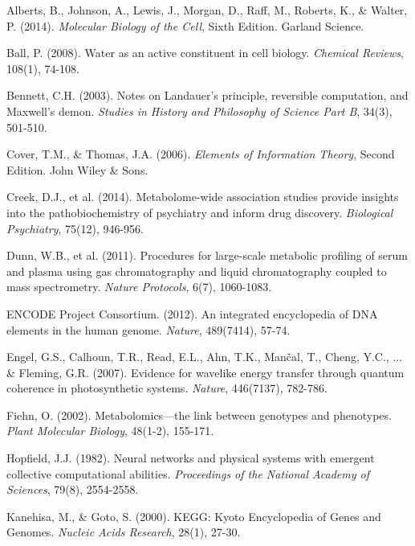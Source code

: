 \documentclass[12pt,a4paper]{article}
\begin{document}
\begin{thebibliography}{99}

Alberts, B., Johnson, A., Lewis, J., Morgan, D., Raff, M., Roberts, K., \& Walter, P. (2014). \textit{Molecular Biology of the Cell}, Sixth Edition. Garland Science.

Ball, P. (2008). Water as an active constituent in cell biology. \textit{Chemical Reviews}, 108(1), 74-108.

Bennett, C.H. (2003). Notes on Landauer's principle, reversible computation, and Maxwell's demon. \textit{Studies in History and Philosophy of Science Part B}, 34(3), 501-510.

Cover, T.M., \& Thomas, J.A. (2006). \textit{Elements of Information Theory}, Second Edition. John Wiley \& Sons.

Creek, D.J., et al. (2014). Metabolome-wide association studies provide insights into the pathobiochemistry of psychiatry and inform drug discovery. \textit{Biological Psychiatry}, 75(12), 946-956.

Dunn, W.B., et al. (2011). Procedures for large-scale metabolic profiling of serum and plasma using gas chromatography and liquid chromatography coupled to mass spectrometry. \textit{Nature Protocols}, 6(7), 1060-1083.

ENCODE Project Consortium. (2012). An integrated encyclopedia of DNA elements in the human genome. \textit{Nature}, 489(7414), 57-74.

Engel, G.S., Calhoun, T.R., Read, E.L., Ahn, T.K., Mančal, T., Cheng, Y.C., ... \& Fleming, G.R. (2007). Evidence for wavelike energy transfer through quantum coherence in photosynthetic systems. \textit{Nature}, 446(7137), 782-786.

Fiehn, O. (2002). Metabolomics—the link between genotypes and phenotypes. \textit{Plant Molecular Biology}, 48(1-2), 155-171.

Hopfield, J.J. (1982). Neural networks and physical systems with emergent collective computational abilities. \textit{Proceedings of the National Academy of Sciences}, 79(8), 2554-2558.

Kanehisa, M., \& Goto, S. (2000). KEGG: Kyoto Encyclopedia of Genes and Genomes. \textit{Nucleic Acids Research}, 28(1), 27-30.


\end{thebibliography}
\end{document}
